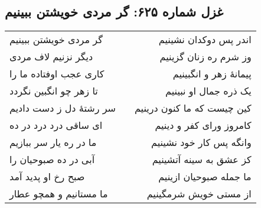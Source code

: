 \begin{center}
\section*{غزل شماره ۶۲۵: گر مردی خویشتن ببینیم}
\label{sec:625}
\begin{longtable}{l p{0.5cm} r}
گر مردی خویشتن ببینیم
&&
اندر پس دوکدان نشینیم
\\
دیگر نزنیم لاف مردی
&&
وز شرم ره زنان گزینیم
\\
کاری عجب اوفتاده ما را
&&
پیمانهٔ زهر و انگبینیم
\\
تا زهر چو انگبین نگردد
&&
یک ذره جمال او نبینیم
\\
سر رشتهٔ دل ز دست دادیم
&&
کین چیست که ما کنون درینیم
\\
ای ساقی درد درد در ده
&&
کامروز ورای کفر و دینیم
\\
ما در ره یار سر ببازیم
&&
وانگه پس کار خود نشینیم
\\
آبی در ده صبوحیان را
&&
کز عشق به سینه آتشینیم
\\
صبح رخ او پدید آمد
&&
ما جمله صبوحیان ازینیم
\\
ما مستانیم و همچو عطار
&&
از مستی خویش شرمگینیم
\\
\end{longtable}
\end{center}
